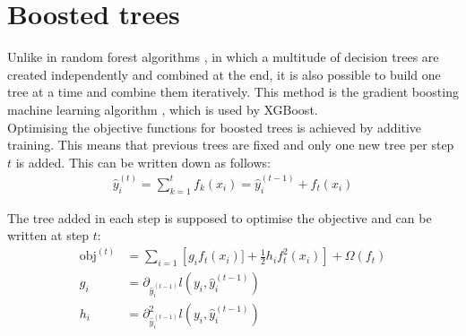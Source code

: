 \section{Boosted trees}
Unlike in random forest algorithms \cite{random}, in which a multitude of decision trees are created independently and combined at the end,
it is also possible to build one tree at a time and
combine them iteratively. This method is the gradient boosting machine learning algorithm \cite{gradient}, which is used by XGBoost. \\
Optimising the objective functions for
boosted trees is achieved by additive training. This means that previous trees are fixed and only one new tree per step $t$ is added. This can be written
down as follows:
\begin{align}
  \hat{y}_i^{(t)} = \sum_{k=1}^t f_k(x_i) = \hat{y}_i^{(t-1)} + f_t(x_i)
\end{align}

The tree added in each step is supposed to optimise the objective and can be written at step $t$:
\begin{align}
  \text{obj}^{(t)} &= \sum_{i=1} \left[g_i f_t(x_i)] + \frac{1}{2}h_i f_t^2(x_i)\right] + \Omega(f_t)  \\
  g_i &= \partial_{\hat{y}_i^{(t-1)}} l(y_i, \hat{y}_i^{(t-1)}) \\
  h_i &= \partial^2_{\hat{y}_i^{(t-1)}} l(y_i, \hat{y}_i^{(t-1)})
\end{align}

